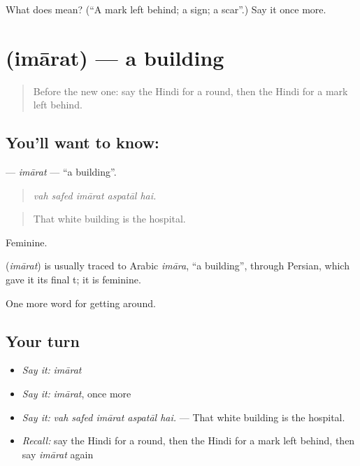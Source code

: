 \begin{tcolorbox}[breakable,colback=teal!4,colframe=teal!35!black,title={Before you move on}]
What does  mean? (\textquotedblleft{}A mark left behind; a sign; a scar\textquotedblright{}.) Say it once more.
\end{tcolorbox}
\section[\texorpdfstring{\hi{इमारत} (imārat)}{इमारत (imārat)}]{ (imārat) — a building}

\label{lesson:HI-C419-imarat}



\begin{quote}
Before the new one: say the Hindi for a round, then the Hindi for a mark left behind.
\end{quote}

\subsection*{You'll want to know: }
\textbf{} — \emph{imārat} — \textquotedblleft{}a building\textquotedblright{}.

\begin{quote}
    
\end{quote}

\begin{quote}
\emph{vah safed imārat aspatāl hai.}
\end{quote}

\begin{quote}
That white building is the hospital.
\end{quote}

Feminine.

\begin{cousinweb}
\textbf{} (\emph{imārat}) is usually traced to Arabic \emph{imāra}, \textquotedblleft{}a building\textquotedblright{}, through Persian, which gave it its final t; it is feminine.
\end{cousinweb}

\begin{grammarlens}[title={What you've built}]
One more word for getting around.
\end{grammarlens}

\subsection*{Your turn}
\begin{itemize}
\raggedright
  \item \emph{Say it:} \emph{imārat}
  \item \emph{Say it:} \emph{imārat}, once more
  \item \emph{Say it:} \emph{vah safed imārat aspatāl hai.} — That white building is the hospital.
  \item \emph{Recall:} say the Hindi for a round, then the Hindi for a mark left behind, then say \emph{imārat} again
\end{itemize}

